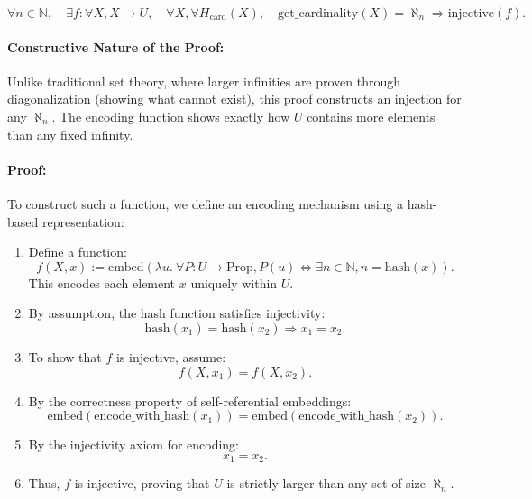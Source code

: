 \documentclass[12pt]{article}
\begin{document}
\begin{equation}
    \forall n \in \mathbb{N}, \quad
    \exists f: \forall X, X \to U, \quad
    \forall X, \forall H_{\text{card}}(X), \quad
    \text{get\_cardinality}(X) = \aleph_n \Rightarrow \text{injective}(f).
\end{equation}

\paragraph{Constructive Nature of the Proof:}
Unlike traditional set theory, where larger infinities are proven through diagonalization (showing what cannot exist), this proof constructs an injection for any \( \aleph_n \). The encoding function shows exactly how \( U \) contains more elements than any fixed infinity.

\paragraph{Proof:}
To construct such a function, we define an encoding mechanism using a hash-based representation:

\begin{enumerate}
    \item Define a function:
    \[
    f(X, x) := \text{embed}(\lambda u.\ \forall P: U \to \text{Prop}, P(u) \Leftrightarrow \exists n \in \mathbb{N}, n = \text{hash}(x)).
    \]
    This encodes each element \( x \) uniquely within \( U \).
    \item By assumption, the hash function satisfies injectivity:
    \[
    \text{hash}(x_1) = \text{hash}(x_2) \Rightarrow x_1 = x_2.
    \]
    \item To show that \( f \) is injective, assume:
    \[
    f(X, x_1) = f(X, x_2).
    \]
    \item By the correctness property of self-referential embeddings:
    \[
    \text{embed}(\text{encode\_with\_hash}(x_1)) = \text{embed}(\text{encode\_with\_hash}(x_2)).
    \]
    \item By the injectivity axiom for encoding:
    \[
    x_1 = x_2.
    \]
    \item Thus, \( f \) is injective, proving that \( U \) is strictly larger than any set of size \( \aleph_n \).
\end{enumerate}
\end{document}

